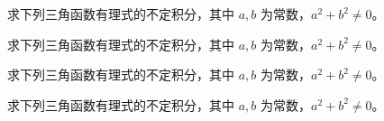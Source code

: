 \noindent\begin{minipage}{\textwidth}
求下列三角函数有理式的不定积分，其中 $a,b$ 为常数，$a^2+b^2\ne0$。
\end{minipage}\par\vfill
\noindent\begin{minipage}{\textwidth}
求下列三角函数有理式的不定积分，其中 $a,b$ 为常数，$a^2+b^2\ne0$。
\end{minipage}\par\vfill
\noindent\begin{minipage}{\textwidth}
求下列三角函数有理式的不定积分，其中 $a,b$ 为常数，$a^2+b^2\ne0$。
\end{minipage}\par\vfill
\newpage
\noindent\begin{minipage}{\textwidth}
求下列三角函数有理式的不定积分，其中 $a,b$ 为常数，$a^2+b^2\ne0$。
\end{minipage}\par\vfill
